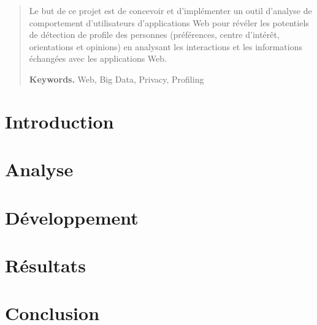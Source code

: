 






\def\myTitle{Développement d'une Application Web pour la Visualisation et la Recherche de Données Médicales}
\def\myName{Kewin Dousse}
\def\myUni{HES-SO}
\def\myDepartment{TIC}
\def\mySupervisors{Sandy Ingram}
\def\myExpert{?}


\begin{abstract}

Le but de ce projet est de concevoir et d'implémenter un outil d'analyse de comportement d'utilisateurs d'applications Web pour révéler les potentiels de détection de profile des personnes (préférences, centre d'intérêt, orientations et opinions) en analysant les interactions et les informations échangées avec les applications Web.

\smallskip
\noindent \textbf{Keywords.} Web, Big Data, Privacy, Profiling

\end{abstract}
\setcounter{page}{3}
\hypersetup{pageanchor=true}

\tableofcontents
\listoffigures

\chapter{Introduction}

\chapter{Analyse}

\chapter{Développement}

\chapter{Résultats}

\chapter{Conclusion}


